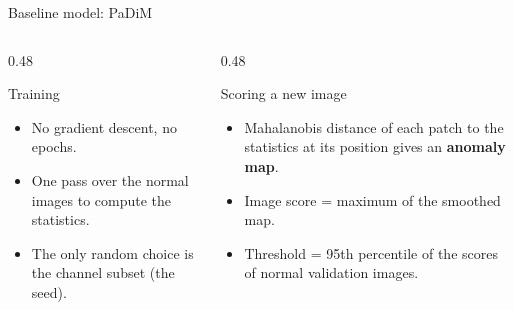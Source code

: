 \documentclass[aspectratio=169,10pt]{beamer}
\begin{document}
\begin{frame}{Baseline model: PaDiM}
  \centering
  \par\vspace{0.4cm}
  \begin{columns}[T]
    \begin{column}{0.48\textwidth}
      \begin{block}{Training}
        \begin{itemize}
          \item No gradient descent, no epochs.
          \item One pass over the normal images to compute the statistics.
          \item The only random choice is the channel subset (the seed).
        \end{itemize}
      \end{block}
    \end{column}
    \begin{column}{0.48\textwidth}
      \begin{block}{Scoring a new image}
        \begin{itemize}
          \item Mahalanobis distance of each patch to the statistics at its position
                gives an \textbf{anomaly map}.
          \item Image score = maximum of the smoothed map.
          \item Threshold = 95th percentile of the scores of normal validation images.
        \end{itemize}
      \end{block}
    \end{column}
  \end{columns}
\end{frame}
\end{document}
